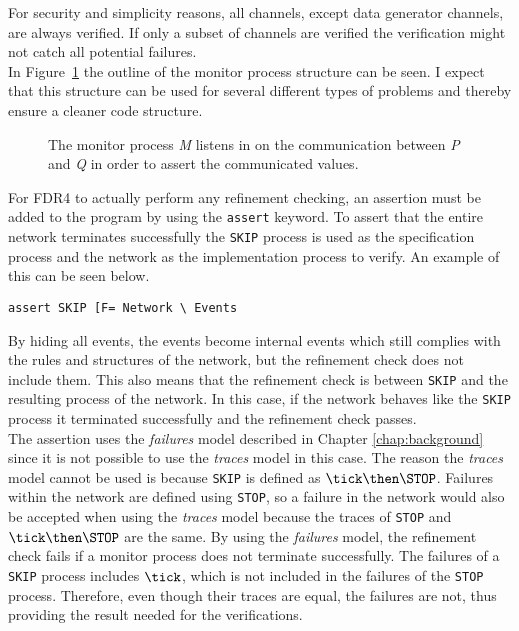 For security and simplicity reasons, all channels, except data generator channels, are always verified. If only a subset of channels are verified the verification might not catch all potential failures.\\

In Figure~\ref{fig:assertion_process} the outline of the monitor process structure can be seen. I expect that this structure can be used for several different types of problems and thereby ensure a cleaner code structure.
\begin{figure}[!ht]
  \centering
  \caption{The monitor process \textit{M} listens in on the communication between \textit{P} and \textit{Q} in order to assert the communicated values.}
  \label{fig:assertion_process}
\end{figure}

For FDR4 to actually perform any refinement checking, an assertion must be added to the \cspm{} program by using the \texttt{assert} keyword.
To assert that the entire network terminates successfully the \texttt{SKIP} process is used as the specification process and the network as the implementation process to verify. An example of this can be seen below.
\begin{verbatim}
assert SKIP [F= Network \ Events
\end{verbatim}
By hiding all events, the events become internal events which still complies with the rules and structures of the network, but the refinement check does not include them. This also means that the refinement check is between \texttt{SKIP} and the resulting process of the network. In this case, if the network behaves like the \texttt{SKIP} process it terminated successfully and the refinement check passes.\\

The assertion uses the \textit{failures} model described in Chapter \ref{chap:background} since it is not possible to use the \textit{traces} model in this case. The reason the \textit{traces} model cannot be used is because \texttt{SKIP} is defined as $\tick \then \STOP$. Failures within the network are defined using \texttt{STOP}, so a failure in the network would also be accepted when using the \textit{traces} model because the traces of \texttt{STOP} and $\tick \then \STOP$ are the same. By using the \textit{failures} model, the refinement check fails if a monitor process does not terminate successfully. The failures of a \texttt{SKIP} process includes $\tick$, which is not included in the failures of the \texttt{STOP} process. Therefore, even though their traces are equal, the failures are not, thus providing the result needed for the verifications.
